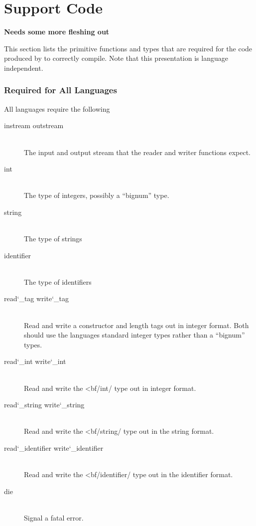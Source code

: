 %
\chapter{Support Code}
\label{chap:support-code}

\textbf{Needs some more fleshing out}

This section lists the primitive functions and types that are required for
the code produced by \asdlgen{} to correctly compile.
Note that this presentation is language independent. 

\subsection{Required for All Languages}
All languages require the following
\begin{description}
  \item[instream outstream] \mbox{}\\
    The input and output stream that the reader and writer functions expect.
  \item[int] \mbox{}\\
    The type of integers, possibly a ``bignum'' type.
  \item[string] \mbox{}\\
    The type of strings
  \item[identifier] \mbox{}\\
    The type of identifiers
  \item[read\char`\_tag write\char`\_tag] \mbox{}\\
    Read and write a constructor and length tags out in \asdl{} integer format.
    Both should use the languages standard integer types rather than a ``bignum'' types.
  \item[read\char`\_int write\char`\_int] \mbox{}\\
    Read and write the <bf/int/ type out in \asdl{} integer format.
  \item[read\char`\_string write\char`\_string] \mbox{}\\
    Read and write the <bf/string/ type out in the \asdl{} string format.
  \item[read\char`\_identifier write\char`\_identifier] \mbox{}\\
    Read and write the <bf/identifier/ type out in the \asdl{} identifier format.
  \item[die] \mbox{}\\
    Signal a fatal error.
\end{description}%

